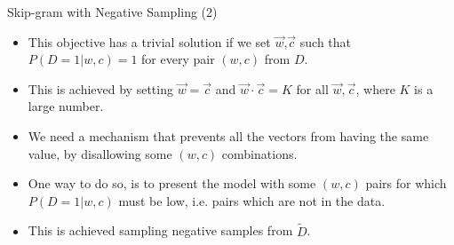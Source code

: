 \documentclass[handout]{beamer}
\begin{document}
\begin{frame}{Skip-gram with Negative Sampling (2)}
\begin{scriptsize}
\begin{itemize}


\item This objective has a trivial solution if we set $\vec{w}$,$\vec{c}$ such that $P(D=1|w,c)=1$ for every pair $(w,c)$ from $D$.
\item This is achieved by setting $\vec{w}=\vec{c}$  and $\vec{w} \cdot \vec{c} = K$ for all $\vec{w},\vec{c}$, where $K$ is a large number.
\item We need a mechanism that prevents all the vectors from having the same value, by disallowing some $(w, c)$ combinations. 
\item One way to do so, is to present the model with some $(w, c)$ pairs for which $P(D= 1|w, c)$ must be low, i.e.
pairs which are not in the data.  
\item This is achieved sampling negative samples from $\tilde{D}$. 





\end{itemize}
\end{scriptsize}
\end{frame}
\end{document}
